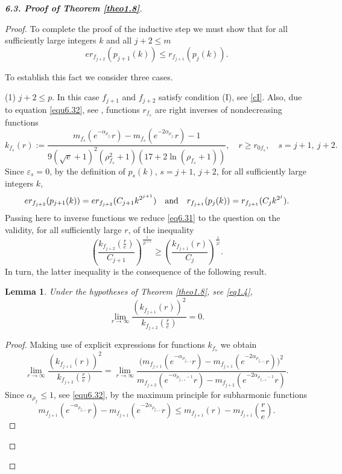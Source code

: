 \documentclass[11pt, oneside]{amsart}
\newtheorem{Lm}[Th]{Lemma}
\begin{document}
\begin{proof}[{\bf 6.3. Proof of Theorem \ref{theo1.8}}]
\begin{proof}
To complete the proof of the inductive step we must show that for all sufficiently large integers $k$ and all $j+2\le m$
\begin{equation}\label{eq6.31}
er_{f_{j+2}}(p_{j+1}(k))\le  r_{f_{j+1}}(p_j(k)).
\end{equation}
 
To establish this fact we consider three cases.\smallskip

(1) $j+2\le p$.  In this case $f_{j+1}$ and $f_{j+2}$ satisfy condition (I), see \eqref{cI}. Also, due to equation \eqref{equ6.32}, see \cite[Eq.\,(9.3), (9.7)]{B}, functions $r_{f_{s}}$ are right inverses of nondecreasing functions
\[
k_{f_{s}}(r):=\frac{m_{f_s}(e^{-\alpha_{\rho_{f_s}}}r)-m_{f_s}(e^{-2\alpha_{\rho_{f_s}}}r)-1}{9(\sqrt{e}+1)^2(\rho_{f_s}^2+1)(17+2\ln(\rho_{f_s}+1))},\quad r\ge r_{0f_s},\quad s=j+1,\ j+2.
\]
Since $\varepsilon_{s}= 0$, by the definition of $p_s(k)$, $s=j+1,\, j+2$,  for all sufficiently large integers $k$,
\[
er_{f_{j+2}}(p_{j+1}(k))= er_{f_{j+2}}(C_{j+1} k^{2^{j+1}})\quad {\rm and}\quad 
r_{f_{j+1}}(p_j(k))= r_{f_{j+1}}(C_j k^{2^{j}}).
\]
Passing here to inverse functions we reduce \eqref{eq6.31} to the question on the validity, for all sufficiently large $r$, of the inequality
\[
\left(\frac{k_{f_{j+2}}\left(\frac re\right)}{C_{j+1}}\right)^{\frac{1}{2^{j+1}}}\ge 
\left(\frac{k_{f_{j+1}}(r)}{C_{j}}\right)^{\frac{1}{2^{j}}}.
\]
In turn, the latter inequality is the consequence of the following result.
\begin{Lm}\label{lem6.4}
Under the hypotheses of Theorem \ref{theo1.8}, see \eqref{eq1.4},
\[
 \lim_{r\rightarrow\infty}\frac{(k_{f_{j+1}}(r))^2}{k_{f_{j+2}}\left(\frac re\right)}=0.
\]
\end{Lm}
\begin{proof}
Making use of explicit expressions for functions $k_{f_s}$ we obtain
\begin{equation}\label{eq6.32}
\lim_{r\rightarrow\infty}\frac{(k_{f_{j+1}}(r))^2}{k_{f_{j+2}}\left(\frac re\right)}
=\lim_{r\rightarrow\infty}\frac{ \bigl(m_{f_{j+1}}(e^{-\alpha_{\rho_{f_{j+1}}}}r)-m_{f_{j+1}}(e^{-2\alpha_{\rho_{f_{j+1}}}}r)\bigr)^{2}}{m_{f_{j+2}}(e^{-\alpha_{\rho_{f_{j+2}}-1}} r)-m_{f_{j+2}}(e^{-2\alpha_{\rho_{f_{j+2}}-1}} r)}.
\end{equation}
Since $\alpha_{\rho_f}\le 1$, see \eqref{equ6.32}, by the maximum principle for subharmonic functions
\begin{equation}\label{eq6.33}
m_{f_{j+1}}(e^{-\alpha_{\rho_{f_{j+1}}}}r)-m_{f_{j+1}}(e^{-2\alpha_{\rho_{f_{j+1}}}}r)\le m_{f_{j+1}}(r)-m_{f_{j+1}}\left(\mbox{$\frac re$}\right).
\end{equation}


\end{proof}
\end{proof}
\end{proof}
\end{document}
